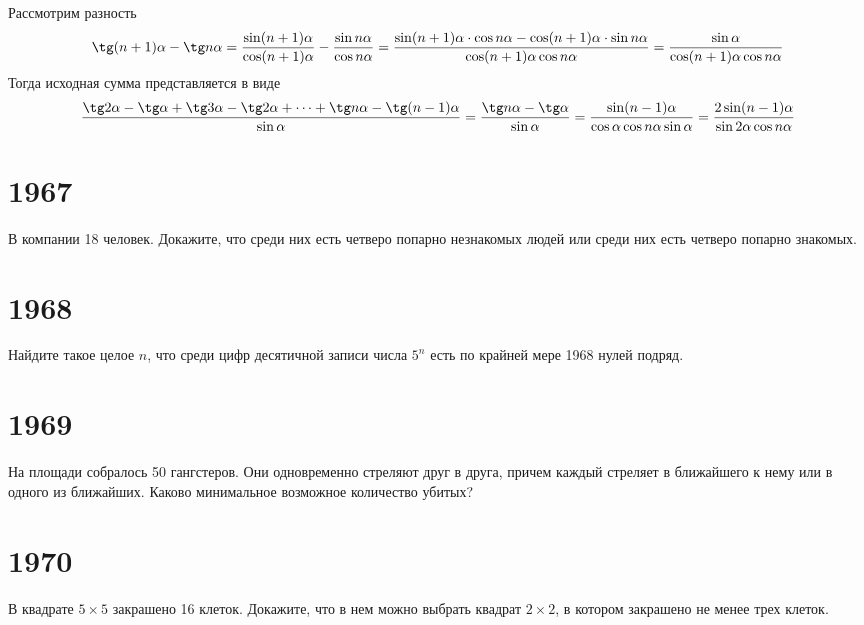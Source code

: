 \documentclass[11pt, a4paper]{problems_template}
\begin{document}
\begin{Solution}
Рассмотрим разность
$$
\tg (n+1)\alpha - \tg n\alpha = \frac{\sin(n+1)\alpha}{\cos(n+1)\alpha} - \frac{\sin n\alpha}{\cos n\alpha} = \frac{\sin(n+1)\alpha \cdot \cos n\alpha -\cos(n+1)\alpha \cdot \sin n\alpha}{\cos(n+1)\alpha\cos n\alpha} = \frac{\sin \alpha}{\cos(n+1)\alpha\cos n\alpha}
$$
Тогда исходная сумма представляется в виде
$$
\frac{\tg 2\alpha - \tg \alpha + \tg 3\alpha - \tg 2\alpha + \dots + \tg n\alpha - \tg (n-1)\alpha}{\sin \alpha} = \frac{\tg n\alpha - \tg \alpha}{\sin\alpha} = \frac{\sin(n-1)\alpha}{\cos\alpha\cos n\alpha\sin\alpha} = \frac{2\sin(n-1)\alpha}{\sin 2\alpha \cos n\alpha}
$$
\end{Solution}

\chapter{1967}

\begin{exercise}
В компании 18 человек. Докажите, что среди них есть четверо попарно незнакомых людей или среди них есть четверо попарно знакомых.
\end{exercise}

\chapter{1968}

\begin{exercise}[36]
Найдите такое целое $n$, что среди цифр десятичной записи числа $5^{n}$ есть по крайней мере 1968 нулей подряд.
\end{exercise}

\chapter{1969}

\begin{exercise}[32]
На площади собралось 50 гангстеров. Они одновременно стреляют друг в друга, причем каждый стреляет в ближайшего к нему или в одного из ближайших. Каково минимальное возможное количество убитых?
\end{exercise}

\chapter{1970}

\begin{exercise}[16]
В квадрате $5 \times 5$ закрашено 16 клеток. Докажите, что в нем можно выбрать квадрат $2 \times 2$, в котором закрашено не менее трех клеток.
\end{exercise}
\end{document}
